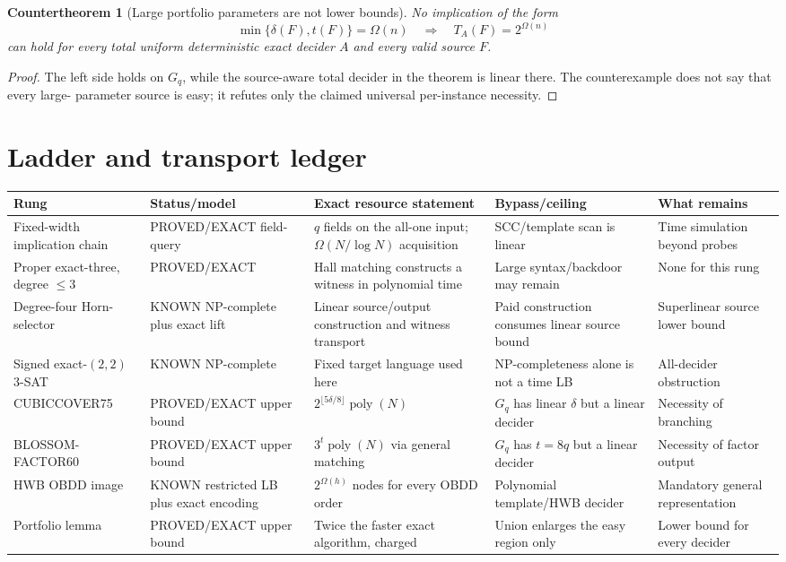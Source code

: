\documentclass[11pt]{article}
\newtheorem{countertheorem}{Countertheorem}
\begin{document}
\begin{countertheorem}[Large portfolio parameters are not lower bounds]
No implication of the form
\[
\min\{\delta(F),t(F)\}=\Omega(n)
\quad\Longrightarrow\quad
T_A(F)=2^{\Omega(n)}
\]
can hold for every total uniform deterministic exact decider $A$ and every
valid source $F$.
\end{countertheorem}
\begin{proof}
The left side holds on $G_q$, while the source-aware total decider in the
theorem is linear there.  The counterexample does not say that every large-
parameter source is easy; it refutes only the claimed universal per-instance
necessity.
\end{proof}

\section{Ladder and transport ledger}
\scriptsize
\begin{longtable}{p{.16\linewidth}p{.15\linewidth}p{.19\linewidth}p{.14\linewidth}p{.14\linewidth}}
\toprule
Rung & Status/model & Exact resource statement & Bypass/ceiling & What remains\\\midrule\endhead
Fixed-width implication chain & PROVED/EXACT field-query & $q$ fields on the all-one input; $\Omega(N/\log N)$ acquisition & SCC/template scan is linear & Time simulation beyond probes\\
Proper exact-three, degree $\le3$ & PROVED/EXACT & Hall matching constructs a witness in polynomial time & Large syntax/backdoor may remain & None for this rung\\
Degree-four Horn-selector & KNOWN NP-complete plus exact lift & Linear source/output construction and witness transport & Paid construction consumes linear source bound & Superlinear source lower bound\\
Signed exact-$(2,2)$ 3-SAT & KNOWN NP-complete & Fixed target language used here & NP-completeness alone is not a time LB & All-decider obstruction\\
CUBICCOVER75 & PROVED/EXACT upper bound & $2^{\lfloor5\delta/8\rfloor}\operatorname{poly}(N)$ & $G_q$ has linear $\delta$ but a linear decider & Necessity of branching\\
BLOSSOM-FACTOR60 & PROVED/EXACT upper bound & $3^t\operatorname{poly}(N)$ via general matching & $G_q$ has $t=8q$ but a linear decider & Necessity of factor output\\
HWB OBDD image & KNOWN restricted LB plus exact encoding & $2^{\Omega(h)}$ nodes for every OBDD order & Polynomial template/HWB decider & Mandatory general representation\\
Portfolio lemma & PROVED/EXACT upper bound & Twice the faster exact algorithm, charged & Union enlarges the easy region only & Lower bound for every decider\\
\bottomrule
\end{longtable}
\normalsize
\end{document}
